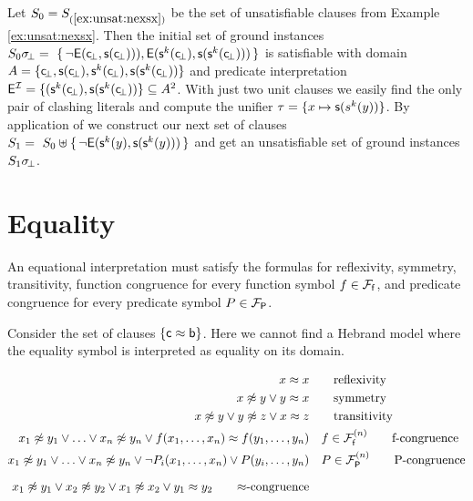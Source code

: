 \begin{example}\label{ex:unsat2}
Let $S_0 = S_{(\ref{ex:unsat:nexsx})}$ be the set of unsatisfiable clauses from Example \ref{ex:unsat:nexsx}. 
Then the initial set of ground instances 
$S_0\sigma\!_\bot =\
\{\,
{ \lnot{\mathsf{E}}({\mathsf c}\!_\bot, {\mathsf s}({\mathsf c}\!_\bot)))}, 
{ {\mathsf{E}}({\mathsf s}^k({\mathsf c}\!_\bot), {\mathsf s}({\mathsf s}^k({\mathsf c}\!_\bot)))}
\,\}$
is satisfiable with domain $A = \{ {\mathsf c}\!_\bot, {\mathsf s}({\mathsf c}\!_\bot), {\mathsf s}^k({\mathsf c}\!_\bot), {\mathsf s}({\mathsf s}^k({\mathsf c}\!_\bot)) \}$
and predicate interpretation 
${\mathsf{E}}^{\mathcal I} = \{ ({\mathsf s}^k({\mathsf c}\!_\bot), {\mathsf s}({\mathsf s}^k({\mathsf c}\!_\bot))
 \} \subseteq A^2$. 
% 
 With just two unit clauses we easily find the only pair of clashing literals and compute the unifier
 $\tau = \{ x\mapsto {\mathsf s}(s^k(y)) \}$. 
 By application of \InstGen we construct our next set of clauses
$
S_1 =\
S_0 \uplus
 \{\,
 { \lnot{\mathsf{E}}({\mathsf s}^k(y), {\mathsf s}({\mathsf s}^k(y)))}
 \,\}
 $ 
 and get an unsatisfiable set of ground instances $S_1\sigma\!_\bot$.
\end{example}




\section{Equality}



	An equational interpretation must satisfy the formulas for reflexivity, symmetry, transitivity, 
	function congruence for every function symbol $f\in{{\mathcal F}_{\mathsf f}}$, 
	and predicate congruence for every predicate symbol $P\in{{\mathcal F}_{\mathsf P}}$.

%

\begin{example}
	Consider the set of clauses $\{ {\mathsf c} \approx {\mathsf b} \}$. Here we cannot find a Hebrand model where the equality symbol is interpreted as equality on its domain.
\end{example}

\begin{align*}
	 x \mEQ x & \tag*{reflexivity} \\
	x \mNE y \lor y \mEQ x & \tag*{symmetry}\\
	x\mNE y\lor y\mNE z\lor x\mEQ z & \tag*{transitivity} \\
	x_1 \mNE y_1\lor\ldots\lor x_n \mNE y_n\lor f(x_1,\ldots,x_n)\mEQ f(y_1,\ldots,y_n) &\quad f\in\mcFfn
	\tag*{f-congruence}
	\\
	x_1\mNE y_1\lor\ldots\lor x_n\mNE y_n\lor\lnot P_i(x_1,\ldots,x_n)\lor P(y_i,\ldots,y_n) &\quad P\in\mcFPn
	\tag*{P-congruence}
	\\[0.7em]
	x_1\mNE y_1\lor x_2\mNE y_2
	\lor x_1\mNE x_2
	\lor y_1\mEQ y_2
	\tag*{$\mEQ$-congruence}
\end{align*}

